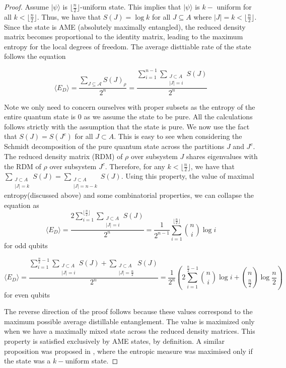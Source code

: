 \documentclass{article}
\newcommand{\ket}[1]{|#1\rangle}
\begin{document}
\begin{proof}
    Assume $\ket{\psi}$ is $\lfloor \frac{n}{2} \rfloor$-uniform state. This implies that $\ket{\psi}$ is $k-$ uniform for all 
    $k < \lfloor \frac{n}{2} \rfloor$. Thus, we have that $S(J) = \log k$ for all $J \subseteq A$ where $|J| = k < \lfloor \frac{n}{2} \rfloor$. Since the state is AME (absolutely maximally entangled), the reduced density matrix becomes proportional to the identity matrix, leading to the maximum entropy for the local degrees of freedom. The average disttiable rate of the state follows the equation 
    
\begin{equation}
\langle E_D \rangle = \frac{\sum_{J \subseteq \mathcal{A}} S(J)_{\rho}}{2^n} = \frac{\sum_{i=1}^{n-1} \sum_{\substack{J \subset A \\ |J| = i}} S(J)}{2^n}
\end{equation}

Note we only need to concern ourselves with proper subsets as the entropy of the entire quantum state is 0 as we assume the state to be pure. All the calculations follows strictly with the assumption that the state is pure. 
We now use the fact that $S(J) = S(J^c)$ for all $J \subset A$. This is easy to see when considering the Schmidt decomposition of the pure quantum state across the partitions $J$ and $J^c$. The reduced density matrix (RDM) of $\rho$ over subsystem $J$ shares eigenvalues with the RDM of $\rho$ over subsystem $J^c$. Therefore, for any $k < \lfloor\frac{n}{2} \rfloor$, we have that $\sum_{\substack{J \subset A \\ |J| = k}} S(J) = \sum_{\substack{J \subset A \\ |J| = n-k}} S(J) $. Using this property, the value of maximal entropy(discussed above) and some combinatorial properties, we can collapse the equation as 
\begin{equation}
\langle E_D \rangle =  \frac{ 2\sum_{i=1}^{\lfloor \frac{n}{2} \rfloor} \sum_{\substack{J \subset A \\ |J| = i}} S(J)}{2^n} = \frac{1}{2^{n-1}} \sum_{i=1}^{\lfloor \frac{n}{2} \rfloor} \binom{n}{i} \log i
\end{equation}
for odd qubits

\begin{equation}
\langle E_D \rangle = \frac{\sum_{i=1}^{\frac{n}{2}-1} \sum_{\substack{J \subset A \\ |J| = i}} S(J) + \sum_{\substack{J \subset A \\ |J| = \frac{n}{2}}} S(J)}{2^n} = \frac{1}{2^n} \left( 2 \sum_{i=1}^{\frac{n}{2} - 1} \binom{n}{i} \log i + \binom{n}{\frac{n}{2}}  \log  \frac{n}{2}  \right)
\end{equation}
 for even qubits

The reverse direction of the proof follows because these values correspond to the maximum possible average distillable entanglement. The value is maximized only when we have a maximally mixed state across the reduced density matrices. This property is satisfied exclusively by AME states, by definition.
 A similar proposition was proposed in \cite{Scott_k-uniform}, where the entropic measure was maximised only if the state was a $k-$uniform state.
\end{proof}
\end{document}
